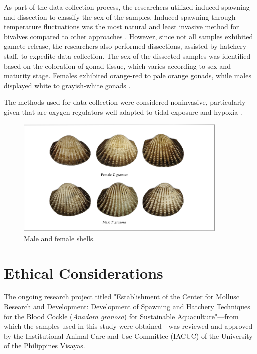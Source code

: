 As part of the data collection process, the researchers utilized induced spawning and dissection to classify the sex of the samples. Induced spawning through temperature fluctuations was the most natural and least invasive method for bivalves compared to other approaches \cite{aji}. However, since not all samples exhibited gamete release, the researchers also performed dissections, assisted by hatchery staff, to expedite data collection. The sex of the dissected samples was identified based on the coloration of gonad tissue, which varies according to sex and maturity stage. Females exhibited orange-red to pale orange gonads, while males displayed white to grayish-white gonads \cite{may2021}.

The methods used for data collection were considered noninvasive, particularly given that \Tgranosa are oxygen regulators well adapted to tidal exposure and hypoxia \cite{davenport1986}.

\begin{figure}[!htbp]
	\centering
	\includegraphics[width=0.9\textwidth]{figures/male-female T.granosa(2).png}
	\caption{Male and female \Tgranosa shells.}
	\label{fig:granosa_shells}
\end{figure}

\section{Ethical Considerations}
\label{sec:ethical}

The ongoing research project titled "Establishment of the Center for Mollusc Research and Development: Development of Spawning and Hatchery Techniques for the Blood Cockle (\textit{Anadara granosa}) for Sustainable Aquaculture"—from which the samples used in this study were obtained—was reviewed and approved by the Institutional Animal Care and Use Committee (IACUC) of the University of the Philippines Visayas. 

